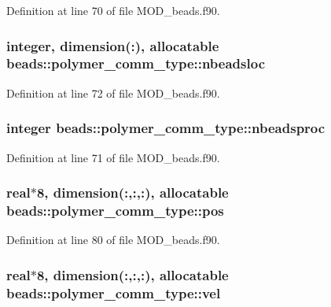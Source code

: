 Definition at line 70 of file M\-O\-D\-\_\-beads.\-f90.

\hypertarget{structbeads_1_1polymer__comm__type_aca9098ebd87b65bc7b3837de908e63dd}{
\subsubsection[{nbeadsloc}]{\setlength{\rightskip}{0pt plus 5cm}integer, dimension(\-:), allocatable beads\-::polymer\-\_\-comm\-\_\-type\-::nbeadsloc}}\label{structbeads_1_1polymer__comm__type_aca9098ebd87b65bc7b3837de908e63dd}


Definition at line 72 of file M\-O\-D\-\_\-beads.\-f90.

\hypertarget{structbeads_1_1polymer__comm__type_a2a3e86e94cb6d06fb89efb01a40d037b}{
\subsubsection[{nbeadsproc}]{\setlength{\rightskip}{0pt plus 5cm}integer beads\-::polymer\-\_\-comm\-\_\-type\-::nbeadsproc}}\label{structbeads_1_1polymer__comm__type_a2a3e86e94cb6d06fb89efb01a40d037b}


Definition at line 71 of file M\-O\-D\-\_\-beads.\-f90.

\hypertarget{structbeads_1_1polymer__comm__type_a23768f5c0d2642acaf4a39132b2c5c46}{
\subsubsection[{pos}]{\setlength{\rightskip}{0pt plus 5cm}real$\ast$8, dimension(\-:,\-:,\-:), allocatable beads\-::polymer\-\_\-comm\-\_\-type\-::pos}}\label{structbeads_1_1polymer__comm__type_a23768f5c0d2642acaf4a39132b2c5c46}


Definition at line 80 of file M\-O\-D\-\_\-beads.\-f90.

\hypertarget{structbeads_1_1polymer__comm__type_af163fba0b99d62e1bc398fd5ea0b1318}{
\subsubsection[{vel}]{\setlength{\rightskip}{0pt plus 5cm}real$\ast$8, dimension(\-:,\-:,\-:), allocatable beads\-::polymer\-\_\-comm\-\_\-type\-::vel}}\label{structbeads_1_1polymer__comm__type_af163fba0b99d62e1bc398fd5ea0b1318}


